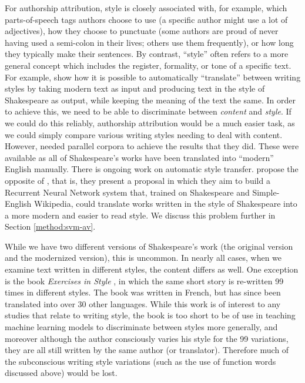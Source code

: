 For authorship attribution, style is closely associated with, for example, which parts-of-speech tags authors choose to use (a specific author might use a lot of adjectives), how they choose to punctuate (some authors are proud of never having used a semi-colon in their lives; others use them frequently), or how long they typically make their sentences. By contrast, ``style'' often refers to a more general concept which includes the register, formality, or tone of a specific text. For example, \citet{jhamtani2017shakespearizing} show how it is possible to automatically ``translate'' between writing styles by taking modern text as input and producing text in the style of Shakespeare as output, while keeping the meaning of the text the same. In order to achieve this, we need to be able to discriminate between \textit{content} and \textit{style}. If we could do this reliably, authorship attribution would be a much easier task, as we could simply compare various writing styles needing to deal with content. However, \citet{jhamtani2017shakespearizing} needed parallel corpora to achieve the results that they did. These were available as all of Shakespeare's works have been translated into ``modern'' English manually. There is ongoing work on automatic style transfer. \citet{kabbara2016stylistic} propose the opposite of \citet{jhamtani2017shakespearizing}, that is, they present a proposal in which they aim to build a Recurrent Neural Network system that, trained on Shakespeare and Simple-English Wikipedia, could translate works written in the style of Shakespeare into a more modern and easier to read style. We discuss this problem further in Section \ref{method:svm-av}.

While we have two different versions of Shakespeare's work (the original version and the modernized version), this is uncommon. In nearly all cases, when we examine text written in different styles, the content differs as well. One exception is the book \textit{Exercises in Style} \cite{queneau1981exercises}, in which the same short story is re-written 99 times in different styles. The book was written in French, but has since been translated into over 30 other languages. While this work is of interest to any studies that relate to writing style, the book is too short to be of use in teaching machine learning models to discriminate between styles more generally, and moreover although the author consciously varies his style for the 99 variations, they are all still written by the same author (or translator). Therefore much of the subconscious writing style variations (such as the use of function words discussed above) would be lost.

